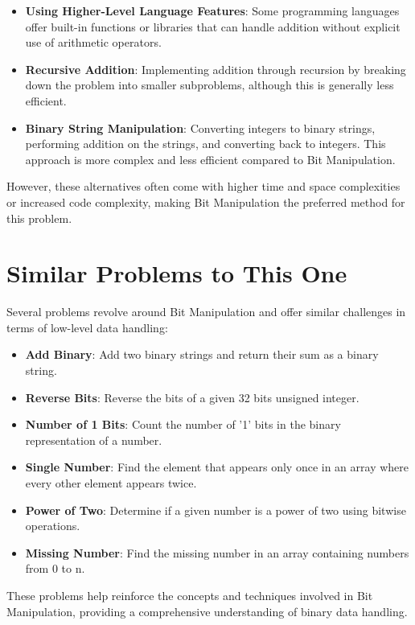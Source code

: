\begin{itemize}
    \item \textbf{Using Higher-Level Language Features}: Some programming languages offer built-in functions or libraries that can handle addition without explicit use of arithmetic operators.
    
    \item \textbf{Recursive Addition}: Implementing addition through recursion by breaking down the problem into smaller subproblems, although this is generally less efficient.
    
    \item \textbf{Binary String Manipulation}: Converting integers to binary strings, performing addition on the strings, and converting back to integers. This approach is more complex and less efficient compared to Bit Manipulation.
\end{itemize}

However, these alternatives often come with higher time and space complexities or increased code complexity, making Bit Manipulation the preferred method for this problem.

\section*{Similar Problems to This One}

Several problems revolve around Bit Manipulation and offer similar challenges in terms of low-level data handling:

\begin{itemize}
    \item \textbf{Add Binary}: Add two binary strings and return their sum as a binary string.
    \item \textbf{Reverse Bits}: Reverse the bits of a given 32 bits unsigned integer.
    \item \textbf{Number of 1 Bits}: Count the number of '1' bits in the binary representation of a number.
    \item \textbf{Single Number}: Find the element that appears only once in an array where every other element appears twice.
    \item \textbf{Power of Two}: Determine if a given number is a power of two using bitwise operations.
    \item \textbf{Missing Number}: Find the missing number in an array containing numbers from 0 to n.
\end{itemize}

These problems help reinforce the concepts and techniques involved in Bit Manipulation, providing a comprehensive understanding of binary data handling.

